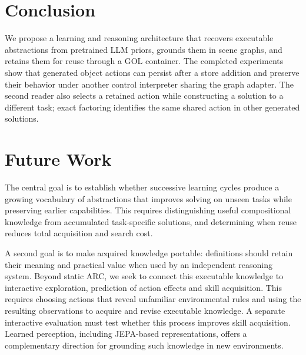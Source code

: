 \documentclass[11pt]{article}
\begin{document}
\section{Conclusion}
We propose a learning and reasoning architecture that recovers executable abstractions from pretrained LLM priors, grounds them in scene graphs, and retains them for reuse through a GOL container. The completed experiments show that generated object actions can persist after a store addition and preserve their behavior under another control interpreter sharing the graph adapter. The second reader also selects a retained action while constructing a solution to a different task; exact factoring identifies the same shared action in other generated solutions.

\section{Future Work}\label{sec:future-work}
The central goal is to establish whether successive learning cycles produce a growing vocabulary of abstractions that improves solving on unseen tasks while preserving earlier capabilities. This requires distinguishing useful compositional knowledge from accumulated task-specific solutions, and determining when reuse reduces total acquisition and search cost.

A second goal is to make acquired knowledge portable: definitions should retain their meaning and practical value when used by an independent reasoning system. Beyond static ARC, we seek to connect this executable knowledge to interactive exploration, prediction of action effects and skill acquisition. This requires choosing actions that reveal unfamiliar environmental rules and using the resulting observations to acquire and revise executable knowledge. A separate interactive evaluation must test whether this process improves skill acquisition. Learned perception, including JEPA-based representations, offers a complementary direction for grounding such knowledge in new environments.
\end{document}
